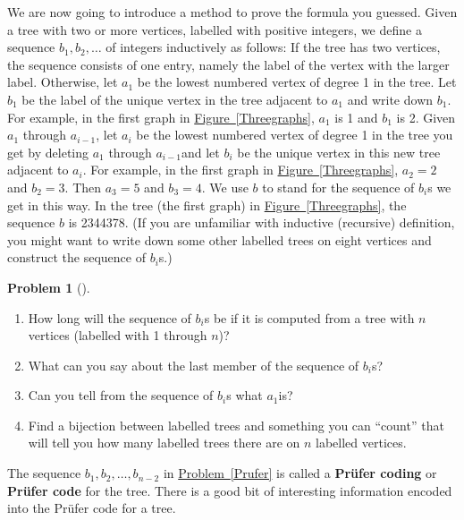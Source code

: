 \documentclass[10pt,]{book}
\newcommand{\terminology}[1]{\textbf{#1}}
\theoremstyle{plain}
\theoremstyle{definition}
\newtheorem{activity}[project]{Problem}
\theoremstyle{definition}
\numberwithin{equation}{chapter}
\begin{document}
We are now going to introduce a method to prove the formula you guessed. Given a tree with two or more vertices, labelled with positive integers, we define a sequence \(b_1,b_2,\ldots\) of integers inductively as follows: If the tree has two vertices, the sequence consists of one entry, namely the label of the vertex with the larger label. Otherwise, let \(a_1\) be the lowest numbered vertex of degree 1 in the tree. Let \(b_1\) be the label of the unique vertex in the tree adjacent to \(a_1\) and write down \(b_1\). For example, in the first graph in \hyperref[Threegraphs]{Figure~\ref{Threegraphs}}, \(a_1\) is 1 and \(b_1\) is 2. Given \(a_1\) through \(a_{i-1}\), let \(a_i\) be the lowest numbered vertex of degree 1 in the tree you get by deleting \(a_1\) through \(a_{i-1}\)and let \(b_i\) be the unique vertex in this new tree adjacent to \(a_i\). For example, in the first graph in \hyperref[Threegraphs]{Figure~\ref{Threegraphs}}, \(a_2=2\) and \(b_2=3\). Then \(a_3=5\) and \(b_3=4\). We use \(b\) to stand for the sequence of \(b_i\)s we get in this way. In the tree (the first graph) in \hyperref[Threegraphs]{Figure~\ref{Threegraphs}}, the sequence \(b\) is 2344378. (If you are unfamiliar with inductive (recursive) definition, you might want to write down some other labelled trees on eight vertices and construct the sequence of \(b_i\)s.)%
\begin{activity}[]\marginsymbol[-1em]{} \label{prufer-props}
\leavevmode%
\begin{enumerate}[font=\bfseries,label=(\alph*),ref=\alph*]
\item\label{task-95} \marginsymbol[-2.5em]{} How long will the sequence of \(b_i\)s be if it is computed from a tree with \(n\) vertices (labelled with 1 through \(n\))?%
\item\label{task-96} \marginsymbol[-2.5em]{} What can you say about the last member of the sequence of \(b_i\)s?%
\item\label{task-97} \marginsymbol[-2.5em]{} Can you tell from the sequence of \(b_i\)s what \(a_1\)is?%
\item\label{task-98} \marginsymbol[-2.5em]{} Find a bijection between labelled trees and something you can ``count'' that will tell you how many labelled trees there are on \(n\) labelled vertices.%
\end{enumerate}
\end{activity}
The sequence \(b_1,b_2,\ldots, b_{n-2}\) in \hyperref[Prufer]{Problem~\ref{Prufer}} is called a \terminology{Prüfer coding} or \terminology{Prüfer code} for the tree. There is a good bit of interesting information encoded into the Prüfer code for a tree.%
\end{document}
